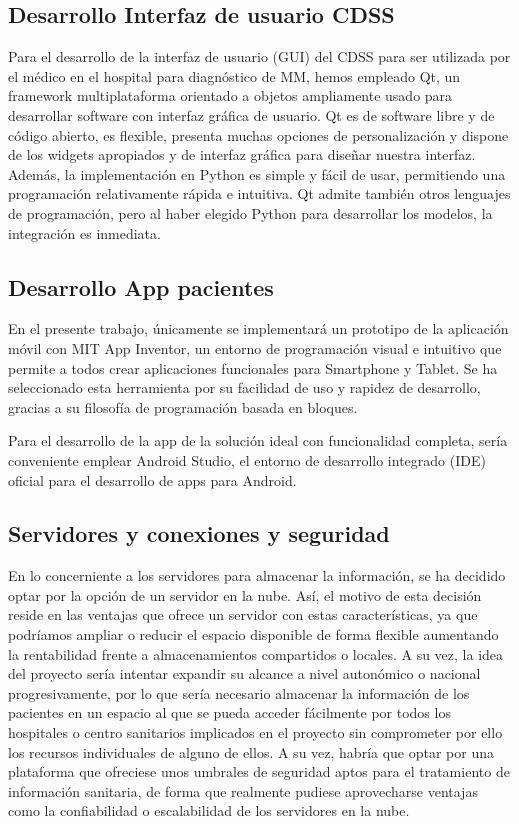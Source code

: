 \documentclass{article}
\begin{document}
\subsection{Desarrollo Interfaz de usuario CDSS}

Para el desarrollo de la interfaz de usuario (GUI) del CDSS para ser
utilizada por el médico en el hospital para diagnóstico de MM, hemos
empleado Qt, un framework multiplataforma orientado a objetos
ampliamente usado para desarrollar software con interfaz gráfica de
usuario. Qt es de software libre y de código abierto, es flexible,
presenta muchas opciones de personalización y dispone de los widgets
apropiados y de interfaz gráfica para diseñar nuestra interfaz.
Además, la implementación en Python es simple y fácil de usar,
permitiendo una programación relativamente rápida e intuitiva. Qt
admite también otros lenguajes de programación, pero al haber elegido
Python para desarrollar los modelos, la integración es inmediata.

\subsection{Desarrollo App pacientes}

En el presente trabajo, únicamente se implementará un prototipo de la
aplicación móvil con MIT App Inventor, un entorno de programación
visual e intuitivo que permite a todos crear aplicaciones funcionales
para Smartphone y Tablet. Se ha seleccionado esta herramienta por su
facilidad de uso y rapidez de desarrollo, gracias a su filosofía de
programación basada en bloques.

Para el desarrollo de la app de la solución ideal con funcionalidad
completa, sería conveniente emplear Android Studio, el entorno de
desarrollo integrado (IDE) oficial para el desarrollo de apps para
Android.



\subsection{Servidores y conexiones y seguridad}


En lo concerniente a los servidores para almacenar la información,  se
ha decidido optar por la opción de un servidor en la  nube.   Así,  el
motivo de esta decisión reside en las ventajas que ofrece un  servidor
con estas características, ya  que  podríamos  ampliar	o  reducir  el
espacio disponible de forma flexible aumentando la rentabilidad frente
a almacenamientos compartidos o  locales.   A  su  vez,  la  idea  del
proyecto sería intentar expandir  su  alcance  a  nivel  autonómico  o
nacional progresivamente, por lo  que  sería  necesario  almacenar  la
información de los pacientes en un espacio al  que  se	pueda  acceder
fácilmente por todos los hospitales o centro sanitarios implicados  en
el proyecto sin comprometer por  ello  los  recursos  individuales  de
alguno de ellos.  A su vez, habría que optar por  una  plataforma  que
ofreciese unos umbrales de seguridad  aptos  para  el  tratamiento  de
información sanitaria, de forma  que  realmente  pudiese  aprovecharse
ventajas como la confiabilidad o escalabilidad de los servidores en la
nube.
\end{document}
